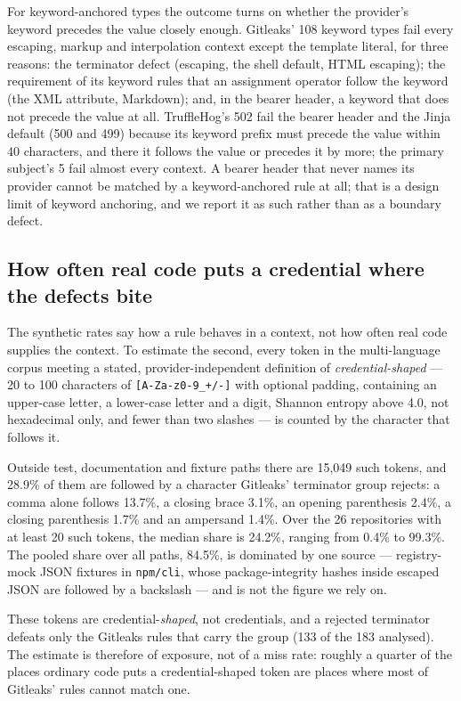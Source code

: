 \documentclass[pdflatex,sn-basic]{sn-jnl}
\begin{document}
For keyword-anchored types the outcome turns on whether the provider's keyword precedes the value closely enough. Gitleaks' 108 keyword types fail every escaping, markup and interpolation context except the template literal, for three reasons: the terminator defect (escaping, the shell default, HTML escaping); the requirement of its keyword rules that an assignment operator follow the keyword (the XML attribute, Markdown); and, in the bearer header, a keyword that does not precede the value at all. TruffleHog's 502 fail the bearer header and the Jinja default (500 and 499) because its keyword prefix must precede the value within 40 characters, and there it follows the value or precedes it by more; the primary subject's 5 fail almost every context. A bearer header that never names its provider cannot be matched by a keyword-anchored rule at all; that is a design limit of keyword anchoring, and we report it as such rather than as a boundary defect.

\subsection{How often real code puts a credential where the defects bite}

The synthetic rates say how a rule behaves in a context, not how often real code supplies the context. To estimate the second, every token in the multi-language corpus meeting a stated, provider-independent definition of \emph{credential-shaped} --- 20 to 100 characters of \texttt{[A-Za-z0-9\_+/-]} with optional padding, containing an upper-case letter, a lower-case letter and a digit, Shannon entropy above 4.0, not hexadecimal only, and fewer than two slashes --- is counted by the character that follows it.

Outside test, documentation and fixture paths there are 15{,}049 such tokens, and 28.9\% of them are followed by a character Gitleaks' terminator group rejects: a comma alone follows 13.7\%, a closing brace 3.1\%, an opening parenthesis 2.4\%, a closing parenthesis 1.7\% and an ampersand 1.4\%. Over the 26 repositories with at least 20 such tokens, the median share is 24.2\%, ranging from 0.4\% to 99.3\%. The pooled share over all paths, 84.5\%, is dominated by one source --- registry-mock JSON fixtures in \texttt{npm/cli}, whose package-integrity hashes inside escaped JSON are followed by a backslash --- and is not the figure we rely on.

These tokens are credential-\emph{shaped}, not credentials, and a rejected terminator defeats only the Gitleaks rules that carry the group (133 of the 183 analysed). The estimate is therefore of exposure, not of a miss rate: roughly a quarter of the places ordinary code puts a credential-shaped token are places where most of Gitleaks' rules cannot match one.
\end{document}
